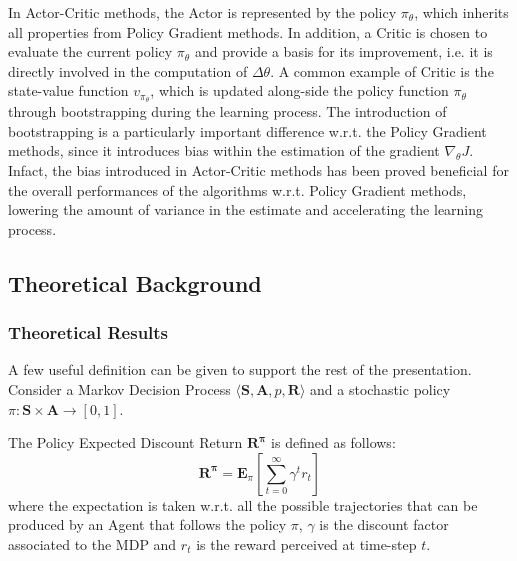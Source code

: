                 In Actor-Critic methods, the Actor is represented by the policy $\pi_\theta$, which inherits all properties from Policy Gradient methods. In addition, a Critic is chosen to evaluate the current policy $\pi_\theta$ and provide a basis for its improvement, i.e. it is directly involved in the computation of $\Delta\theta$. A common example of Critic is the state-value function $v_{\pi_{\theta}}$, which is updated along-side the policy function $\pi_\theta$ through bootstrapping during the learning process. The introduction of bootstrapping is a particularly important difference w.r.t. the Policy Gradient methods, since it introduces bias within the estimation of the gradient $\nabla_{\theta}J$. Infact, the bias introduced in Actor-Critic methods has been proved beneficial for the overall performances of the algorithms w.r.t. Policy Gradient methods, lowering the amount of variance in the estimate and accelerating the learning process. \newline
                
        \newpage
        \subsection{Theoretical Background}
        \label{subs:theoretical_background}
            \subsubsection{Theoretical Results}
                A few useful definition can be given to support the rest of the presentation. Consider a Markov Decision Process $\langle \mathbf{S}, \mathbf{A}, p, \mathbf{R}\rangle$ and a stochastic policy $\pi : \mathbf{S} \times \mathbf{A} \rightarrow [0, 1]$.
                
                \begin{definition}
                    \label{def:policyreturn}
                    The Policy Expected Discount Return $\mathbf{R^{\pi}}$ is defined as follows:
                    \[ \mathbf{R^{\pi}} =  \mathbf{E}_{\pi} \left[ \sum_{t=0}^\infty \gamma^t r_{t} \right] \]
                    where the expectation is taken w.r.t. all the possible trajectories that can be produced by an Agent that follows the policy $\pi$, $\gamma$ is the discount factor associated to the MDP and $r_t$ is the reward perceived at time-step $t$.
                \end{definition}
                
